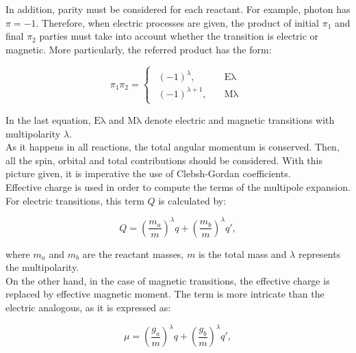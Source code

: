 \documentclass[openany]{book}
\begin{document}
In addition, parity must be considered for each reactant. For example, photon has $\pi = -1$. Therefore, when electric processes are given, the product of initial $\pi_1$ and final $\pi_2$ parties must take into account whether the transition is electric or magnetic. More particularly, the referred product has the form: 

\begin{equation} \label{eq:radiativeCapture_parity}
	\pi_1 \pi_2 = 	\left\{\begin{array}{l}
		\begin{split}
			(-1)^{\lambda}, \quad & \mathrm{E\lambda} \\ 
			(-1)^{\lambda + 1}, \quad & \mathrm{M\lambda}
		\end{split}
	\end{array}\right.
\end{equation}

In the last equation, $\mathrm{E\lambda}$ and $\mathrm{M\lambda}$ denote electric and magnetic transitions with multipolarity $\lambda$. \\

As it happens in all reactions, the total angular momentum is conserved. Then, all the spin, orbital and total  contributions should be considered. With this picture given, it is imperative the use of Clebsh-Gordan coefficients. \\

Effective charge is used in order to compute the terms of the multipole expansion. For electric transitions, this term $Q$ is calculated by:

\begin{equation} \label{eq:radiativeCapture_Electric_charge}
	Q =  \left(\frac{m_a}{m}\right)^{\lambda}q + \left(\frac{m_b}{m}\right)^{\lambda}q',
\end{equation}

where $m_a$ and $m_b$ are the reactant masses, $m$ is the total mass and $\lambda$ represents the multipolarity. \\

On the other hand, in the case of magnetic transitions, the effective charge is replaced by effective magnetic moment.
The term is more intricate than the electric analogous, as it is expressed as: 

\begin{equation} \label{eq:radiativeCapture_Magnetic_moment}
	\mu =  \left(\frac{g_a}{m}\right)^{\lambda}q + \left(\frac{g_b}{m}\right)^{\lambda}q',
\end{equation}
\end{document}
